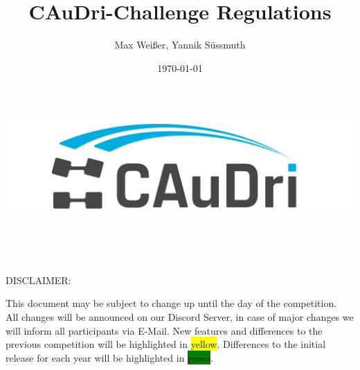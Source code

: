 \documentclass[a4paper]{report}
\title{CAuDri-Challenge Regulations \the\year{}}
\author{Max Weißer, Yannik Süssmuth}
\date{\today}
\begin{document}
\begin{titlepage}
	\makeatletter
	\begin{center}
		\vspace*{3cm}

		\includegraphics[width=\textwidth]{graphics/caudri_logo_no_border.jpg}\\
		\vspace{1cm}

		\Huge\bfseries\@title\\
		\vspace{\baselineskip}

		\Large\@date\\
		\vspace{8cm}

		\large DISCLAIMER:\\

		{\raggedright This document may be subject to change up until the day of the competition.\\
		All changes will be announced on our Discord Server, in case of major changes we will inform all participants via E-Mail.
		New features and differences to the previous competition will be highlighted in \colorbox{yellow}{yellow}.
		Differences to the initial release for each year will be highlighted in \colorbox{green}{green}.\\}

	\end{center}
	\makeatother
\end{titlepage}

\tableofcontents









\end{document}
